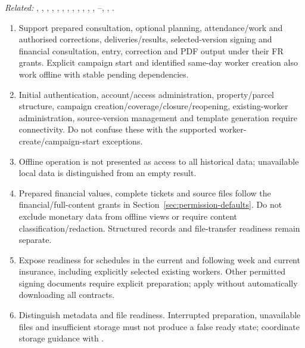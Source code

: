 \textit{Related:} \hyperref[fr:004]{}, \hyperref[fr:011]{}, \hyperref[fr:015]{}, \hyperref[fr:016]{}, \hyperref[fr:020]{}, \hyperref[fr:023]{}, \hyperref[fr:028]{}, \hyperref[fr:029]{}, \hyperref[fr:034]{}, \hyperref[fr:037]{}, \hyperref[fr:039]{}, \hyperref[fr:045]{}, \hyperref[fr:048]{}--\hyperref[fr:054]{}, \hyperref[fr:060]{}, \hyperref[fr:062]{}.
\begin{enumerate}[label=(\alph*),leftmargin=*,itemsep=1pt,topsep=3pt]
\item Support prepared consultation, optional planning, attendance/work and authorised corrections, deliveries/results, selected-version signing and financial consultation, entry, correction and PDF output under their FR grants. Explicit campaign start and identified same-day worker creation also work offline with stable pending dependencies.
\item Initial authentication, account/access administration, property/parcel structure, campaign creation/coverage/closure/reopening, existing-worker administration, source-version management and template generation require connectivity. Do not confuse these with the supported worker-create/campaign-start exceptions.
\item Offline operation is not presented as access to all historical data; unavailable local data is distinguished from an empty result.
\item Prepared financial values, complete tickets and source files follow the financial/full-content grants in Section~\ref{sec:permission-defaults}. Do not exclude monetary data from offline views or require content classification/redaction. Structured records and file-transfer readiness remain separate.
\item Expose readiness for schedules in the current and following week and current insurance, including explicitly selected existing workers. Other permitted signing documents require explicit preparation; apply \hyperref[br:029]{} without automatically downloading all contracts.
\item Distinguish metadata and file readiness. Interrupted preparation, unavailable files and insufficient storage must not produce a false ready state; coordinate storage guidance with \hyperref[nfr:AOC-05]{}.
\end{enumerate}

